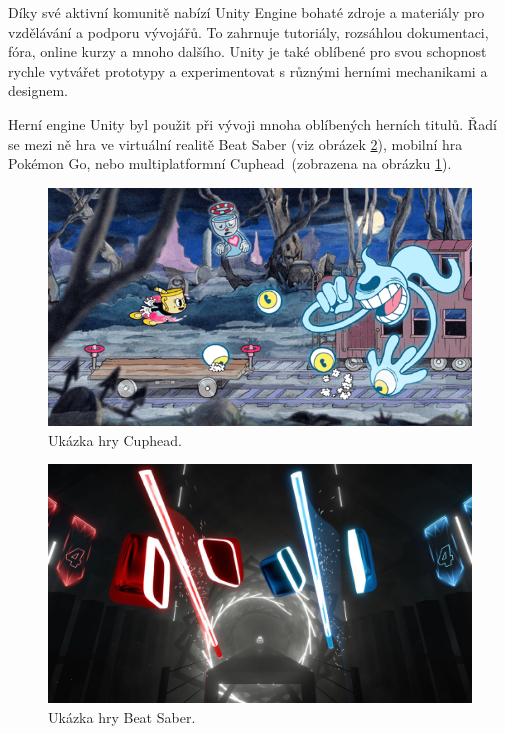 Díky své aktivní komunitě nabízí Unity Engine bohaté zdroje a materiály pro vzdělávání a podporu vývojářů. To zahrnuje tutoriály, rozsáhlou dokumentaci, fóra, online kurzy a mnoho dalšího. Unity je také oblíbené pro svou schopnost rychle vytvářet prototypy a experimentovat s různými herními mechanikami a designem.

Herní engine Unity byl použit při vývoji mnoha oblíbených herních titulů. Řadí se mezi ně hra ve virtuální realitě Beat Saber (viz obrázek \ref{fig:beatSaber}), mobilní hra Pokémon Go, nebo multiplatformní Cuphead~(zobrazena na obrázku \ref{fig:cuphead}).
\begin{figure}[H]
	\centering
	\includegraphics[scale=0.61]{obrazky-figures/Cuphead.png}
	\caption{Ukázka hry Cuphead.}
	\label{fig:cuphead}
\end{figure}
\begin{figure}[H]
	\centering
	\includegraphics[scale=0.15]{obrazky-figures/BeatSaber.jpg}
	\caption{Ukázka hry Beat Saber.}
	\label{fig:beatSaber}
\end{figure}

\newpage

